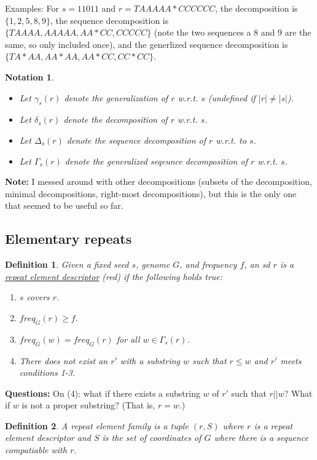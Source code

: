 \documentclass{article}
\newtheorem{notation}{Notation}
\newtheorem{definition}{Definition}
\begin{document}
Examples: For $s=11011$ and $r = TAAAAA*CCCCCC$, the decomposition is
$\{1,2,5,8,9\}$, the sequence decomposition is $\{TAAAA, AAAAA, AA*CC,
CCCCC\}$ (note the two sequences a 8 and 9 are the same, so only
included once), and the generlized sequence decomposition is $\{TA*AA,
AA*AA, AA*CC, CC*CC\}$. 
    
\begin{notation}
  \begin{itemize}
  \item Let $\gamma_s(r)$ denote the generalization of $r$ w.r.t. $s$
  (undefined if $|r| \neq |s|$).
  \item Let $\delta_s(r)$ denote the decomposition of $r$ w.r.t. $s$.
  \item Let $\Delta_s(r)$ denote the sequence decomposition of $r$ w.r.t. to
  $s$.
  \item Let $\Gamma_s(r)$ denote the generalized seqeunce decomposition of
  $r$ w.r.t. $s$.
  \end{itemize}
\end{notation}

{\bf Note:} I messed around with other decompositions (subsets of the
decomposition, minimal decompositions, right-most decompositions), but
this is the only one that seemed to be useful so far.

\subsection{Elementary repeats}

\begin{definition}
  \label{ERdef}
  Given a fixed seed $s$, genome $G$, and frequency $f$, an sd $r$ is
  a \underline{repeat element descriptor} (red) if the following
  holds true:
  \begin{enumerate}
  \item $s$ covers $r$.
  \item $freq_G(r) \geq f$.
  \item $freq_G(w) = freq_G(r)$ for all $w \in \Gamma_s(r)$.
  \item There does not exist an $r'$ with a substring $w$ such that
    $r \leq w$ and $r'$ meets conditions 1-3.
  \end{enumerate}
\end{definition}
{\bf Questions:} On (4): what if there exists a substring $w$ of $r'$
such that $r || w$?  What if $w$ is not a proper substring?  (That is,
$r = w$.)

\begin{definition}
  A {\it repeat element family} is a tuple $(r,S)$ where $r$ is a
  repeat element descriptor and $S$ is the set of coordinates of $G$
  where there is a sequence compatiable with $r$.
\end{definition}
\end{document}

